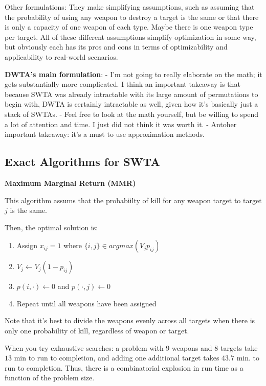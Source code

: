 \documentclass[12pt]{article} %
\begin{document}
Other formulations:
They make simplifying assumptions, such as assuming that the probability of using any weapon
to destroy a target is the same or that there is only a capacity of one weapon of each type. Maybe there is 
one weapon type per target. All of these different assumptions simplify optimization in some way, but obviously
each has its pros and cons in terms of optimizability and applicability to real-world scenarios.  

{\bf DWTA's main formulation}:
- I'm not going to really elaborate on the math; it gets substantially more complicated. I think an important 
takeaway is that because SWTA was already intractable with its large amount of permutations to begin with, 
DWTA is certainly intractable as well, given how it's basically just a stack of SWTAs. 
- Feel free to look at the math yourself, but be willing to spend a lot of attention and time. I just did not think it was worth it.
- Antoher important takeaway: it's a must to use approximation methods. 


\subsection*{Exact Algorithms for SWTA}

{\bf Maximum Marginal Return (MMR)}

This algorithm assums that the probabiilty of kill for any weapon target to target $j$ is the same.

Then, the optimal solution is:

\begin{enumerate}
\item Assign $x_{ij} = 1$ where $\{i, j\} \in argmax(V_j p_{ij})$
\item $V_j \leftarrow V_j(1-p_{ij})$
\item $p(i, \cdot) \leftarrow 0$ and $p(\cdot, j) \leftarrow 0$
\item Repeat until all weapons have been assigned
\end{enumerate}

Note that it's best to divide the weapons evenly across all targets when there is only one 
probability of kill, regardless of weapon or target.\\


When you try exhaustive searches: a problem with $9$ weapons and $8$ targets
take $13$ min to run to completion, and adding one additional target takes $43.7$ min. to run to completion. 
Thus, there is a combinatorial explosion in run time as a function of the problem size.
\end{document}

